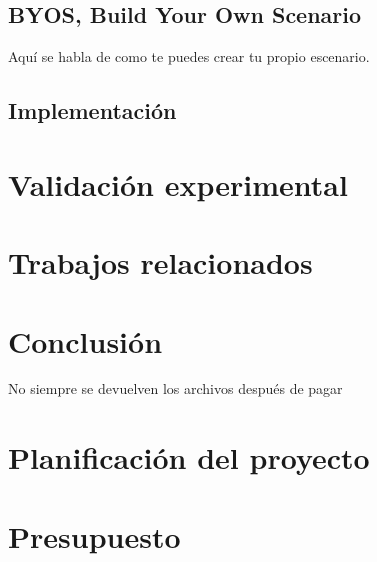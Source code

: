\documentclass[a4paper,12pt]{article}
\begin{document}
\subsection{BYOS, Build Your Own Scenario}
Aquí se habla de como te puedes crear tu propio escenario.
\subsection{Implementación}
\section{Validación experimental}
\section{Trabajos relacionados}
\section{Conclusión}
No siempre se devuelven los archivos después de pagar
\appendix
\section{Planificación del proyecto}
\section{Presupuesto}
\end{document}
